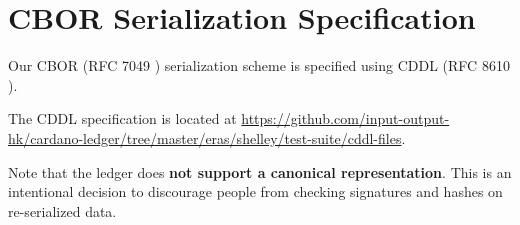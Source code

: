 \section{CBOR Serialization Specification}
\label{sec:cddl}

Our CBOR (RFC 7049 \cite{rfcCBOR})
serialization scheme is specified using
CDDL (RFC 8610 \cite{rfcCDDL}).

The CDDL specification is located at
\url{https://github.com/input-output-hk/cardano-ledger/tree/master/eras/shelley/test-suite/cddl-files}.

% 

Note that the ledger does
\textbf{not support a canonical representation}.
This is an intentional decision to discourage people from
checking signatures and hashes on re-serialized data.
